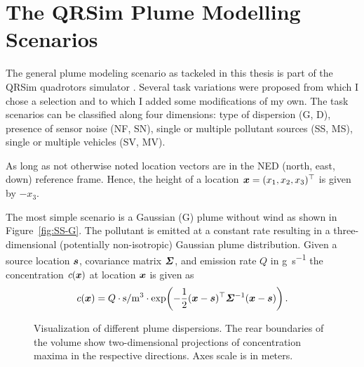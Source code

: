 \chapter{The QRSim Plume Modelling Scenarios}
The general plume modeling scenario as tackeled in this thesis is part of the 
QRSim quadrotors simulator \parencite{denardi2013rn}. Several task variations 
were proposed from which I chose a selection and to which I added some 
modifications of my own.  The task scenarios can be classified along four 
dimensions: type of dispersion (G, D), presence of sensor noise (NF, SN), single 
or multiple pollutant sources (SS, MS), single or multiple vehicles (SV, MV).

As long as not otherwise noted location vectors are in the NED (north, east, 
down) reference frame.  Hence, the height of a location $\bm{x} = (x_1, x_2, 
x_3)^{\top}$ is given by $-x_3$.

The most simple scenario is a Gaussian (G) plume without wind as shown in 
Figure~\ref{fig:SS-G}.  The pollutant is emitted at a constant rate resulting in 
a three-dimensional (potentially non-isotropic) Gaussian plume distribution.  
Given a source location $\bm{s}$, covariance matrix $\bm{\varSigma}$, and 
emission rate $Q$ in \si{\gram\per\second} the concentration $c(\bm{x})$ at 
location $\bm{x}$ is given as
\begin{equation}
    c(\vc x) = Q \cdot \si{\second\per\meter^3} \cdot \exp\!\del{-\frac{1}{2} 
        (\vc x - \vc s)\Tr \mat \varSigma^{-1} (\vc x - \vc s)}.
\end{equation}

\begin{figure}
    \centering
    \caption[Visualizations of plume dispersions]{Visualization of different 
        plume dispersions. The rear boundaries of the volume show 
        two-dimensional projections of concentration maxima in the respective 
        directions. Axes scale is in meters.}
\end{figure}

